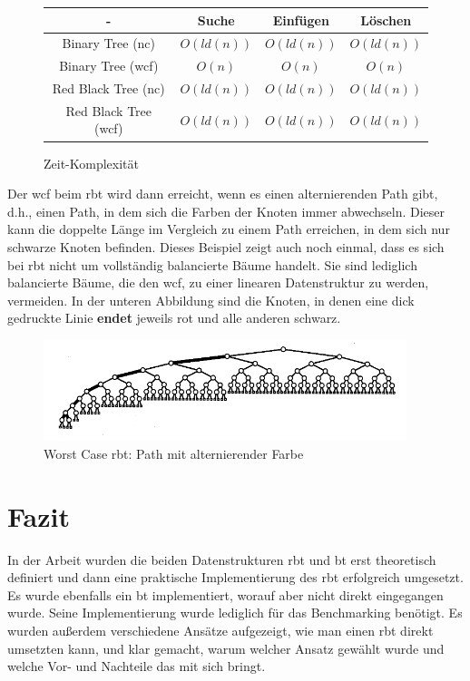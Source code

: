 \documentclass[11pt]{article}
\begin{document}
\begin{figure}[h]
  \centering  
  \caption{Zeit-Komplexität}
  \begin{tabular}{|c|c|c|c|} 
    \hline
    - & Suche & Einfügen & Löschen \\ 
    \hline
    Binary Tree (\gls{nc}) & $O(ld(n))$ & $O(ld(n))$ & $O(ld(n))$ \\ 
    \hline
    Binary Tree (\gls{wcf}) & $O(n)$ & $O(n)$ & $O(n)$ \\ 
    \hline
    Red Black Tree (\gls{nc}) & $O(ld(n))$ & $O(ld(n))$ & $O(ld(n))$ \\ 
    \hline
    Red Black Tree (\gls{wcf}) & $O(ld(n))$ & $O(ld(n))$ & $O(ld(n))$ \\ 
    \hline
  \end{tabular}
\end{figure}
\cite[S.215, S. 227f]{aic}

Der \gls{wcf} beim \gls{rbt} wird dann erreicht, wenn es einen alternierenden Path gibt, d.h., einen Path, in dem sich die Farben der Knoten immer abwechseln.
Dieser kann die doppelte Länge im Vergleich zu einem Path erreichen, in dem sich nur schwarze Knoten befinden.
Dieses Beispiel zeigt auch noch einmal, dass es sich bei \gls{rbt} nicht um vollständig balancierte Bäume handelt. Sie sind lediglich balancierte Bäume, die den \gls{wcf}, zu einer linearen Datenstruktur zu werden, vermeiden.
In der unteren Abbildung sind die Knoten, in denen eine dick gedruckte Linie \textbf{endet} jeweils rot und alle anderen schwarz.  

\begin{figure}[h]
  \centering
  \includegraphics[width=400px]{worst_case.png}
  \caption{Worst Case \gls{rbt}: Path mit alternierender Farbe}
\end{figure}
\cite[S. 228]{aic}

\pagebreak
\section{Fazit}

In der Arbeit wurden die beiden Datenstrukturen \gls{rbt} und \gls{bt} erst theoretisch definiert 
und dann eine praktische Implementierung des \gls{rbt} erfolgreich umgesetzt. Es wurde ebenfalls ein \gls{bt} implementiert, 
worauf aber nicht direkt eingegangen wurde. Seine Implementierung wurde lediglich für das Benchmarking benötigt.
Es wurden außerdem verschiedene Ansätze aufgezeigt, wie man einen \gls{rbt} direkt umsetzten kann, und klar gemacht, warum welcher Ansatz gewählt wurde und welche Vor- und Nachteile das mit sich bringt.
\end{document}
